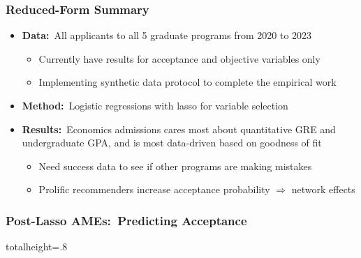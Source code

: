 \documentclass[12pt, aspectratio=169]{beamer}
\begin{document}
\begin{frame}[label=rfs]
\frametitle{Reduced-Form Summary}
\begin{itemize}
\item \textbf{Data:}\ All applicants to all 5 graduate programs from 2020 to 2023
\vspace{5pt}
\begin{itemize}
\item Currently have results for acceptance and objective variables only
\vspace{5pt}
\item Implementing synthetic data protocol to complete the empirical work
\vspace{10pt}
\end{itemize}
\item \textbf{Method:}\ Logistic regressions with lasso for variable selection
\vspace{10pt}
\item \textbf{Results:}\ Economics admissions cares most about quantitative GRE and undergraduate GPA, and is most data-driven based on goodness of fit 
\vspace{5pt}
\begin{itemize}
\item Need success data to see if other programs are making mistakes
\vspace{5pt}
\item Prolific recommenders increase acceptance probability $\Rightarrow$ network effects
\vspace{10pt}
\end{itemize}
\end{itemize}
\hyperlink{mbp}{}
\hyperlink{emm}{}
\end{frame}

\begin{frame}[label=pllra]
\frametitle{Post-Lasso AMEs:\ Predicting Acceptance}
\begin{table}[htbp]
\begin{center}
\begin{adjustbox}{totalheight=.8\textheight}
\resizebox*{!}{\dimexpr\textheight-3.5\baselineskip\relax}{
}
\end{adjustbox}
\end{center}
\end{table}
\hyperlink{fpllra}{}
\hyperlink{lra}{}
\hyperlink{lrrm}{}
\end{frame}
\end{document}
